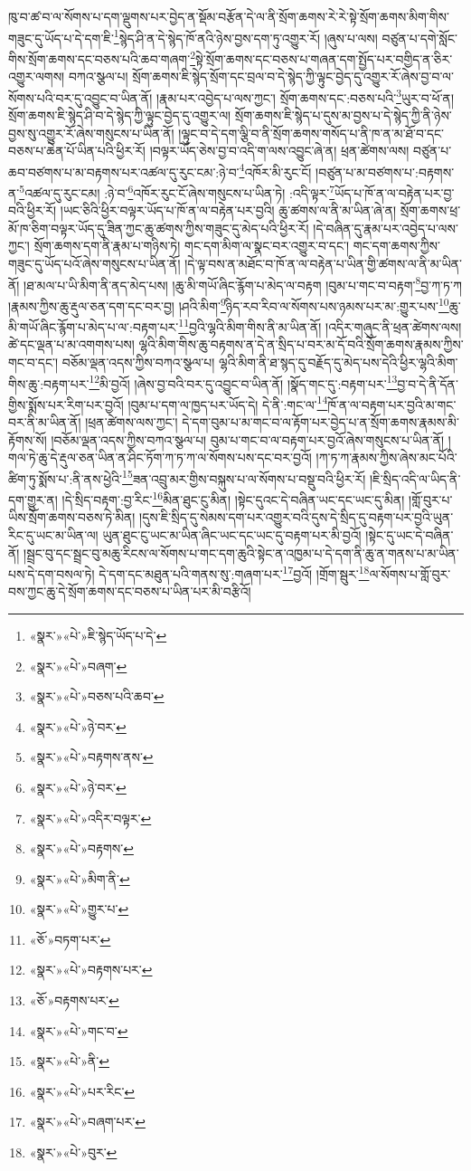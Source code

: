 ཁུ་བ་ཚ་བ་ལ་སོགས་པ་དག་ལྡུགས་པར་བྱེད་ན་སྡོམ་བརྩོན་དེ་ལ་ནི་སྲོག་ཆགས་རེ་རེ་སྟེ་སྲོག་ཆགས་མིག་གིས་གཟུང་དུ་ཡོད་པ་དེ་དག་ཇི་\footnote{«སྣར་»«པེ་»ཇི་སྙེད་ཡོད་པ་དེ་}སྙེད་ཤི་ན་དེ་སྙེད་ཁོ་ནའི་ཉེས་བྱས་དག་ཏུ་འགྱུར་རོ། །ཞུས་པ་ལས། བཙུན་པ་དགེ་སློང་གིས་སྲོག་ཆགས་དང་བཅས་པའི་ཆབ་གཞག་\footnote{«སྣར་»«པེ་»བཞག་}སྟེ་སྲོག་ཆགས་དང་བཅས་པ་གཞན་དག་སྤྱོད་པར་བགྱིད་ན་ཅིར་འགྱུར་ལགས། བཀའ་སྩལ་པ། སྲོག་ཆགས་ཇི་སྙེད་སྲོག་དང་བྲལ་བ་དེ་སྙེད་ཀྱི་ལྟུང་བྱེད་དུ་འགྱུར་རོ་ཞེས་བྱ་བ་ལ་སོགས་པའི་བར་དུ་འབྱུང་བ་ཡིན་ནོ། །རྣམ་པར་འབྱེད་པ་ལས་ཀྱང་། སྲོག་ཆགས་དང་:བཅས་པའི་\footnote{«སྣར་»«པེ་»བཅས་པའི་ཆབ་}ཡུར་བ་ཕོ་ན། སྲོག་ཆགས་ཇི་སྙེད་ཤི་བ་དེ་སྙེད་ཀྱི་ལྟུང་བྱེད་དུ་འགྱུར་ལ། སྲོག་ཆགས་ཇི་སྙེད་པ་དུས་མ་བྱས་པ་དེ་སྙེད་ཀྱི་ནི་ཉེས་བྱས་སུ་འགྱུར་རོ་ཞེས་གསུངས་པ་ཡིན་ནོ། །ལྟུང་བ་དེ་དག་ལྕི་བ་ནི་སྲོག་ཆགས་གསོད་པ་ནི་ཁ་ན་མ་ཐོ་བ་དང་བཅས་པ་ཆེན་པོ་ཡིན་པའི་ཕྱིར་རོ། །བལྟར་ཡོད་ཅེས་བྱ་བ་འདི་ག་ལས་འབྱུང་ཞེ་ན། ཕྲན་ཚེགས་ལས། བཙུན་པ་ཆབ་བཙགས་པ་མ་བརྟགས་པར་འཚལ་དུ་རུང་ངམ་:ཉེ་བ་\footnote{«སྣར་»«པེ་»ཉེ་བར་}འཁོར་མི་རུང་ངོ། །བཙུན་པ་མ་བཙགས་པ་:བརྟགས་ན་\footnote{«སྣར་»«པེ་»བརྟགས་ནས་}འཚལ་དུ་རུང་ངམ། :ཉེ་བ་\footnote{«སྣར་»«པེ་»ཉེ་བར་}འཁོར་རུང་ངོ་ཞེས་གསུངས་པ་ཡིན་ཏེ། :འདི་ལྟར་\footnote{«སྣར་»«པེ་»འདིར་བལྟར་}ཡོད་པ་ཁོ་ན་ལ་བརྟེན་པར་བྱ་བའི་ཕྱིར་རོ། །ཡང་ཅིའི་ཕྱིར་བལྟར་ཡོད་པ་ཁོ་ན་ལ་བརྟེན་པར་བྱའི། ཆུ་ཚགས་ལ་ནི་མ་ཡིན་ཞེ་ན། སྲོག་ཆགས་ཕྲ་མོ་ཁ་ཅིག་བལྟར་ཡོད་དུ་ཟིན་ཀྱང་ཆུ་ཚགས་ཀྱིས་གཟུང་དུ་མེད་པའི་ཕྱིར་རོ། །དེ་བཞིན་དུ་རྣམ་པར་འབྱེད་པ་ལས་ཀྱང་། སྲོག་ཆགས་དག་ནི་རྣམ་པ་གཉིས་ཏེ། གང་དག་མིག་ལ་སྣང་བར་འགྱུར་བ་དང་། གང་དག་ཆགས་ཀྱིས་གཟུང་དུ་ཡོད་པའོ་ཞེས་གསུངས་པ་ཡིན་ནོ། །དེ་ལྟ་བས་ན་མཐོང་བ་ཁོ་ན་ལ་བརྟེན་པ་ཡིན་གྱི་ཚགས་ལ་ནི་མ་ཡིན་ནོ། །ཐ་མལ་པ་ཡི་མིག་ནི་ནད་མེད་པས། །ཆུ་མི་གཡོ་ཞིང་རྙོག་པ་མེད་ལ་བརྟག །བུམ་པ་གང་བ་བརྟག་\footnote{«སྣར་»«པེ་»བརྟགས་}བྱ་ཀ་ཏ་ཀ །རྣམས་ཀྱིས་ཆུ་རྡུལ་ཅན་དག་དང་བར་བྱ། །ཤའི་མིག་\footnote{«སྣར་»«པེ་»མིག་ནི་}ཉིད་རབ་རིབ་ལ་སོགས་པས་ཉམས་པར་མ་:གྱུར་པས་\footnote{«སྣར་»«པེ་»གྱུར་པ་}ཆུ་མི་གཡོ་ཞིང་རྙོག་པ་མེད་པ་ལ་:བརྟག་པར་\footnote{«ཅོ་»བཏག་པར་}བྱའི་ལྷའི་མིག་གིས་ནི་མ་ཡིན་ནོ། །འདིར་གཞུང་ནི་ཕྲན་ཚེགས་ལས། ཚེ་དང་ལྡན་པ་མ་འགགས་པས། ལྷའི་མིག་གིས་ཆུ་བརྟགས་ན་དེ་ན་སྲིད་པ་བར་མ་དོ་བའི་སྲོག་ཆགས་རྣམས་ཀྱིས་གང་བ་དང་། བཅོམ་ལྡན་འདས་ཀྱིས་བཀའ་སྩལ་པ། ལྷའི་མིག་ནི་ཐ་སྙད་དུ་བརྗོད་དུ་མེད་པས་དེའི་ཕྱིར་ལྷའི་མིག་གིས་ཆུ་:བརྟག་པར་\footnote{«སྣར་»«པེ་»བརྟགས་པར་}མི་བྱའོ། །ཞེས་བྱ་བའི་བར་དུ་འབྱུང་བ་ཡིན་ནོ། །སྣོད་གང་དུ་:བརྟག་པར་\footnote{«ཅོ་»བརྟགས་པར་}བྱ་བ་དེ་ནི་དོན་གྱིས་སྨོས་པར་རིག་པར་བྱའོ། །བུམ་པ་དག་ལ་ཁྱད་པར་ཡོད་དེ། དེ་ནི་:གང་ལ་\footnote{«སྣར་»«པེ་»གང་བ་}ཁོ་ན་ལ་བརྟག་པར་བྱའི་མ་གང་བར་ནི་མ་ཡིན་ནོ། །ཕྲན་ཚེགས་ལས་ཀྱང་། དེ་དག་བུམ་པ་མ་གང་བ་ལ་རྟོག་པར་བྱེད་པ་ན་སྲོག་ཆགས་རྣམས་མི་རྟོགས་སོ། །བཅོམ་ལྡན་འདས་ཀྱིས་བཀའ་སྩལ་པ། བུམ་པ་གང་བ་ལ་བརྟག་པར་བྱའོ་ཞེས་གསུངས་པ་ཡིན་ནོ། །གལ་ཏེ་ཆུ་དེ་རྡུལ་ཅན་ཡིན་ན་ཤིང་ཏོག་ཀ་ཏ་ཀ་ལ་སོགས་པས་དང་བར་བྱའོ། །ཀ་ཏ་ཀ་རྣམས་ཀྱིས་ཞེས་མང་པོའི་ཚིག་ཏུ་སྨོས་པ་:ནི་ནས་ཕྱེའི་\footnote{«སྣར་»«པེ་»ནི་}ཟན་འབྲུ་མར་གྱིས་བསྐུས་པ་ལ་སོགས་པ་བསྡུ་བའི་ཕྱིར་རོ། །ཇི་སྲིད་འདི་ལ་ཡིད་ནི་དག་གྱུར་ན། །དེ་སྲིད་བརྟག་:བྱ་རིང་\footnote{«སྣར་»«པེ་»པར་རིང་}མིན་ཐུང་ངུ་མིན། །སྟེང་དུའང་དེ་བཞིན་ཡང་དང་ཡང་དུ་མིན། །གློ་བུར་པ་ཡིས་སྲོག་ཆགས་བཅས་ཏེ་མིན། །དུས་ཇི་སྲིད་དུ་སེམས་དག་པར་འགྱུར་བའི་དུས་དེ་སྲིད་དུ་བརྟག་པར་བྱའི་ཡུན་རིང་དུ་ཡང་མ་ཡིན་ལ། ཡུན་ཐུང་ངུ་ཡང་མ་ཡིན་ཞིང་ཡང་དང་ཡང་དུ་བརྟག་པར་མི་བྱའོ། །སྟེང་དུ་ཡང་དེ་བཞིན་ནོ། །སྦྲང་བུ་དང་སྦྲང་བུ་མཆུ་རིངས་ལ་སོགས་པ་གང་དག་ཆུའི་སྟེང་ན་འཁྱམ་པ་དེ་དག་ནི་ཆུ་ན་གནས་པ་མ་ཡིན་པས་དེ་དག་བསལ་ཏེ། དེ་དག་དང་མཐུན་པའི་གནས་སུ་:གཞག་པར་\footnote{«སྣར་»«པེ་»བཞག་པར་}བྱའོ། །གྲོག་སྦུར་\footnote{«སྣར་»«པེ་»བུར་}ལ་སོགས་པ་གློ་བུར་བས་ཀྱང་ཆུ་དེ་སྲོག་ཆགས་དང་བཅས་པ་ཡིན་པར་མི་བརྩིའོ། 